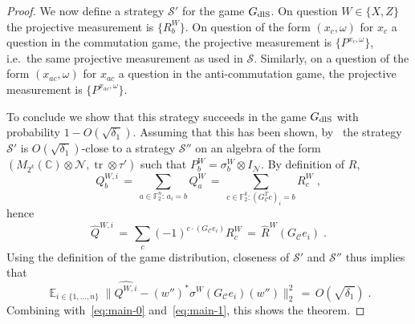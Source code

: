 \documentclass[11pt]{article}
\theoremstyle{definition}
\newcommand{\strategy}{\mathscr{S}}
\DeclareMathOperator*{\Expectation}{\mathbb{E}}
\newcommand{\Es}[1]{\Expectation_{#1}}
\newcommand{\C}{\ensuremath{\mathbb{C}}}
\newcommand{\dlS}{\ensuremath{\rm dlS}}
\newcommand{\F}{\ensuremath{\mathbb{F}}}
\newcommand{\mC}{\ensuremath{\mathcal{C}}}
\newcommand{\mN}{\mathcal{N}}
\DeclareMathOperator{\tr}{tr}
\begin{document}
\begin{proof}
We now define a strategy $\strategy'$ for the game $G_{\dlS}$. On question $W\in \{X,Z\}$ the projective measurement is $\{R^W_b\}$. On question of the form $(x_c,\omega)$ for $x_c$ a question in the commutation game, the projective measurement is $\{P^{x_c,\omega}\}$, i.e.\ the same projective measurement as used in $\strategy$. Similarly, on a question of the form $(x_{ac},\omega)$ for $x_{ac}$ a question in the anti-commutation game, the projective measurement is $\{P^{x_{ac},\omega}\}$.

To conclude we show that this strategy succeeds in the game $G_{\dlS}$ with probability $1-O(\sqrt{\delta_1})$. Assuming that this has been shown, by~\cite[Corollary 3.9]{de2022spectral} the strategy $\strategy'$ is $O(\sqrt{\delta_1})$-close to a strategy $\strategy''$ on an algebra of the form $(M_{2^{k}}(\C)\otimes \mN,\tr\otimes \tau')$ such that $P^W_b = \sigma^W_b\otimes I_\mN$. By definition of $R$, 
\begin{equation}\label{eq:main-3}
 Q^{W,i}_b \,=\,  \sum_{a \in \F_2^n:\,a_i=b}  Q^W_a \,=\, \sum_{c \in \F^k_2: (G_\mC^T c)_i=b}  R^W_c \;,
\end{equation}
hence
\begin{equation*}
 \widehat{Q}^{W,i}\,=\, \sum_c (-1)^{c\cdot (G_\mC e_i)} R^W_c \,=\, \widehat{R}^W(G_\mC e_i)\;.
\end{equation*}
Using the definition of the game distribution, closeness of $\strategy'$ and $\strategy''$ thus implies that
\begin{equation*}
\Es{i\in\{1,\ldots,n\}} \big\|\widehat{Q^{W,i}} - (w'')^* {\sigma^W}(G_\mC e_i) (w'') \big\|_2^2 \,=\,O(\sqrt{\delta_1})\;.
\end{equation*}
Combining with~\eqref{eq:main-0} and~\eqref{eq:main-1}, this shows the theorem.


\end{proof}
\end{document}

